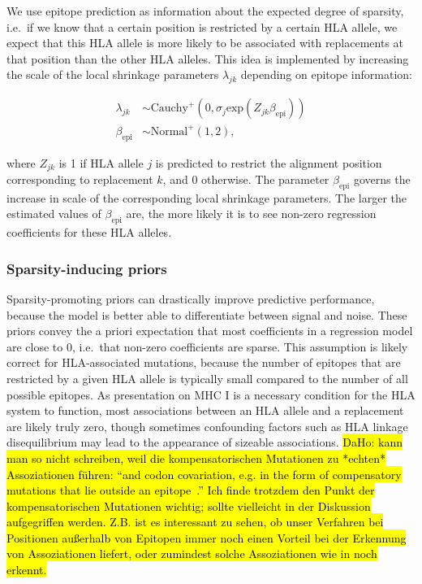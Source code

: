 \documentclass{bioinfo}
\begin{document}
\begin{methods}
We use epitope prediction as information about the expected degree of sparsity, i.e.\ if we know that a certain position is restricted by a certain HLA allele, we expect that this HLA allele is more likely to be associated with replacements at that position than the other HLA alleles. This idea is implemented by increasing the scale of the local shrinkage parameters \(\lambda_{jk}\) depending on epitope information:

\begin{equation}
  \begin{aligned}
    \lambda_{jk} &\sim \text{Cauchy}^{+}(0, \sigma_{j}\text{exp}(Z_{jk}\beta_{\text{epi}})) \\
    \beta_{\text{epi}} &\sim \text{Normal}^{+}(1, 2),
  \end{aligned}
\end{equation}
 
where \(Z_{jk}\) is 1 if HLA allele \(j\) is predicted to restrict the alignment position corresponding to replacement \(k\), and 0 otherwise. The parameter \(\beta_{\text{epi}}\) governs the increase in scale of the  corresponding local shrinkage parameters. The larger the estimated values of \(\beta_{\text{epi}}\) are, the more likely it is to see non-zero regression coefficients for these HLA alleles.

\subsubsection{Sparsity-inducing priors}
  
Sparsity-promoting priors \citep{Piironen2017} can drastically improve predictive performance, because the model is better able to differentiate between signal and noise. These priors convey the a priori expectation that most coefficients in a regression model are close to 0, i.e.\ that non-zero coefficients are sparse. This assumption is likely correct for HLA-associated mutations, because the number of epitopes that are restricted by a given HLA allele is typically small compared to the number of all possible epitopes. As presentation on MHC I is a necessary condition for the HLA system to function, most associations between an HLA allele and a replacement are likely truly zero, though sometimes confounding factors such as HLA linkage disequilibrium may lead to the appearance of sizeable associations.
\hl{DaHo: kann man so nicht schreiben, weil die kompensatorischen Mutationen zu *echten* Assoziationen führen: ``and codon covariation,
e.g. in the form of compensatory mutations that lie outside an epitope~\citep{Ruhl2011}.'' Ich finde trotzdem den Punkt der kompensatorischen Mutationen wichtig; sollte vielleicht in der Diskussion aufgegriffen werden. Z.B. ist es interessant zu sehen, ob unser Verfahren bei Positionen außerhalb von Epitopen immer noch einen Vorteil bei der Erkennung von Assoziationen liefert, oder zumindest solche Assoziationen wie in \citet{Ruhl2011} noch erkennt.}


\end{methods}
\end{document}
